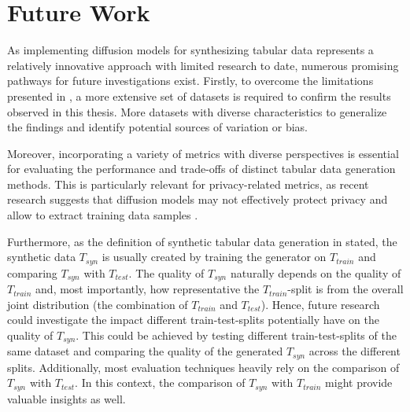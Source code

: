 \section{Future Work}
\label{ch:results-futureWork}

As implementing diffusion \glspl{model} for synthesizing tabular data represents a relatively innovative approach with limited research to date, numerous promising pathways for future investigations exist.
Firstly, to overcome the limitations presented in , a more extensive set of datasets is required to confirm the results observed in this thesis.
More datasets with diverse characteristics to generalize the findings and identify potential sources of variation or bias.

Moreover, incorporating a variety of metrics with diverse perspectives is essential for evaluating the performance and trade-offs of distinct tabular data generation methods.
This is particularly relevant for privacy-related metrics, as recent research suggests that diffusion \glspl{model} may not effectively protect privacy and allow to extract training data samples \cite{carlini2023ExtractingTrainingData}.

Furthermore, as the definition of synthetic tabular data generation in  stated, the synthetic data $T_{syn}$ is usually created by training the generator on $T_{train}$ and comparing $T_{syn}$ with $T_{test}$.
The quality of $T_{syn}$ naturally depends on the quality of $T_{train}$ and, most importantly, how representative the $T_{train}$-split is from the overall joint distribution (the combination of $T_{train}$ and $T_{test}$).
Hence, future research could investigate the impact different train-test-splits potentially have on the quality of $T_{syn}$.
This could be achieved by testing different train-test-splits of the same dataset and comparing the quality of the generated $T_{syn}$ across the different splits.
Additionally, most evaluation techniques heavily rely on the comparison of $T_{syn}$ with $T_{test}$.
In this context, the comparison of $T_{syn}$ with $T_{train}$ might provide valuable insights as well.

